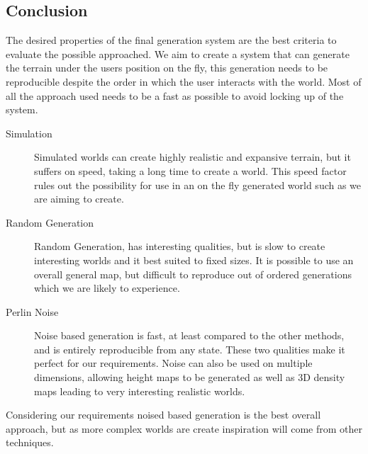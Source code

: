 \subsection{Conclusion}
The desired properties of the final generation system are the best criteria to
evaluate the possible approached. We aim to create a system that can generate
the terrain under the users position on the fly, this generation needs to be
reproducible despite the order in which the user interacts with the world. Most
of all the approach used needs to be a fast as possible to avoid locking up of
the system.\\

\begin{description}
\item[Simulation]
Simulated worlds can create highly realistic
and expansive terrain, but it suffers on speed, taking a long time to create a 
world. This speed factor rules out the possibility for use in an on the fly 
generated world such as we are aiming to create. 

\item[Random Generation] Random Generation, has 
interesting qualities, but is slow to create interesting worlds and it best
suited to fixed sizes. It is possible to use an overall general map, but 
difficult to reproduce out of ordered generations which we are likely to
experience. 

\item[Perlin Noise] Noise based generation is fast, at least compared to the other
methods, and is entirely reproducible from any state. These two qualities make it
perfect for our requirements. Noise can also be used on multiple dimensions, 
allowing height maps to be generated as well as 3D density maps leading to very
interesting realistic worlds.
\end{description}

Considering our requirements noised based generation is the best overall 
approach,
but as more complex worlds are create inspiration will come from other 
techniques.\\
